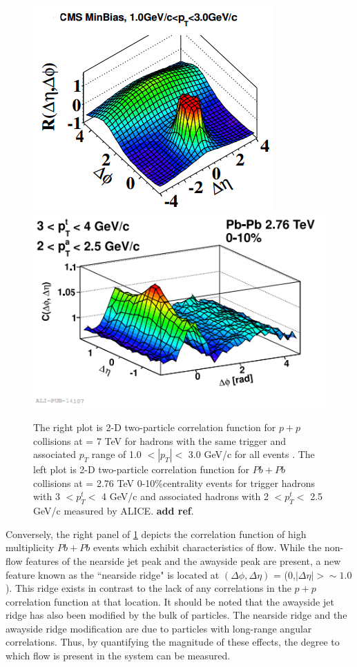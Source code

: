 \begin{figure}[!ht]
\begin{center}
\includegraphics[width=0.43\linewidth]{figs/pp_correlation_function_min_bias.png}
\includegraphics[width=0.48\linewidth]{figs/pbpb_correlation_function_010.png}
\caption{The right plot is 2-D two-particle correlation function for $p+p$ collisions at \sqsn = 7 TeV for hadrons with the same trigger and associated $p_T$ range of 1.0 $<|p_T|<$ 3.0 GeV/c for all events \cite{Khachatryan2010}. The left plot is 2-D two-particle correlation function for $Pb+Pb$ collisions at \sqsn = 2.76 TeV 0-10\%centrality events for trigger hadrons with 3 $<p_T^t<$ 4 GeV/c and associated hadrons with 2 $<p_T^t<$ 2.5 GeV/c measured by ALICE. \textbf{add ref}.}
\label{fig:corr_function_example}
\end{center}
\end{figure}

Conversely, the right panel of \ref{fig:corr_function_example} depicts the correlation function of high multiplicity $Pb+Pb$ events which exhibit characteristics of flow. 
While the non-flow features of the nearside jet peak and the awayside peak are present, a new feature known as the ``nearside ridge" is located at $(\Delta\phi,\Delta\eta)$ = (0,$|\Delta\eta|> \sim1.0$). This ridge exists in contrast to the lack of any correlations in the $p+p$ correlation function at that location. It should be noted that the awayside jet ridge has also been modified by the bulk of particles. The nearside ridge and the awayside ridge modification are due to particles with long-range angular correlations. Thus, by quantifying the magnitude of these effects, the degree to which flow is present in the system can be measured.

